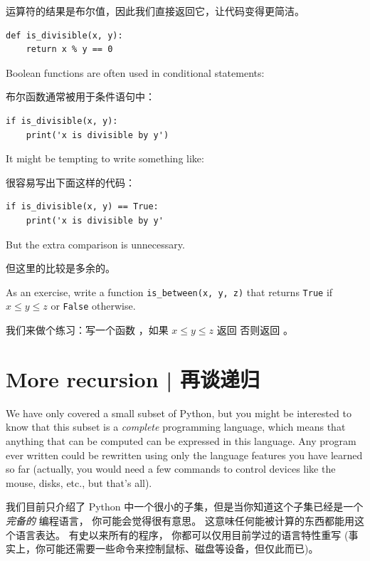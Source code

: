 \li{==} 运算符的结果是布尔值，因此我们直接返回它，让代码变得更简洁。

\begin{lstlisting}
def is_divisible(x, y):
    return x % y == 0
\end{lstlisting}

%
Boolean functions are often used in conditional statements:

布尔函数通常被用于条件语句中：
  

\begin{lstlisting}
if is_divisible(x, y):
    print('x is divisible by y')
\end{lstlisting}

%
It might be tempting to write something like:

很容易写出下面这样的代码：

\begin{lstlisting}
if is_divisible(x, y) == True:
    print('x is divisible by y'
\end{lstlisting}

%
But the extra comparison is unnecessary.

但这里的比较是多余的。

As an exercise, write a function \verb"is_between(x, y, z)" that
returns {\tt True} if $x \le y \le z$ or {\tt False} otherwise.

我们来做个练习：写一个函数   ，如果 $x \le y \le z$ 返回  否则返回 。

\section{More recursion  |  再谈递归}
\label{more.recursion}
  
    

We have only covered a small subset of Python, but you might
be interested to know that this subset is a {\em complete}
programming language, which means that anything that can be
computed can be expressed in this language.  Any program ever written
could be rewritten using only the language features you have learned
so far (actually, you would need a few commands to control devices
like the mouse, disks, etc., but that's all).

我们目前只介绍了 Python 中一个很小的子集，但是当你知道这个子集已经是一个 {\em 完备的} 编程语言， 你可能会觉得很有意思。
这意味任何能被计算的东西都能用这个语言表达。
有史以来所有的程序， 你都可以仅用目前学过的语言特性重写 (事实上，你可能还需要一些命令来控制鼠标、磁盘等设备，但仅此而已)。

